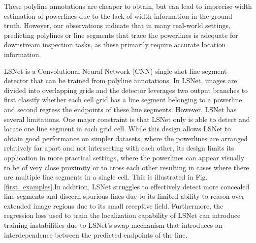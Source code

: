 \documentclass[journal]{IEEEtran}
\begin{document}
These polyline annotations are cheaper to obtain, but can lead to imprecise width estimation of powerlines due to the lack of width information in the ground truth. However, our observations indicate that in many real-world settings, predicting polylines or line segments that trace the powerlines is adequate for downstream inspection tasks, as these primarily require accurate location information.

LSNet \cite{Nguyen2020} %
is a Convolutional Neural Network (CNN) single-shot line segment detector that can be trained from polyline annotations. In LSNet, images are divided into overlapping grids and the detector leverages two output branches to first classify whether each cell grid has a line segment belonging to a powerline and second regress the endpoints of these line segments.
However, LSNet has several limitations. One major constraint is that LSNet only is able to detect and locate one line segment in each grid cell. While this design allows LSNet to obtain good performance on simpler datasets, where the powerlines are arranged relatively far apart and not intersecting with each other, its design limits its application in more practical settings, where the powerlines can appear visually to be of very close proximity or to cross each other resulting in cases where there are multiple line segments in a single cell. This is illustrated in Fig. \ref{first_examples}.In addition, LSNet struggles to effectively detect more concealed line segments and discern spurious lines due to its limited ability to reason over extended image regions  due to its small receptive field. Furthermore, the regression loss used to train the localization capability of LSNet can introduce training instabilities due to LSNet's swap mechanism that introduces an interdependence between the predicted endpoints of the line. %
\end{document}
